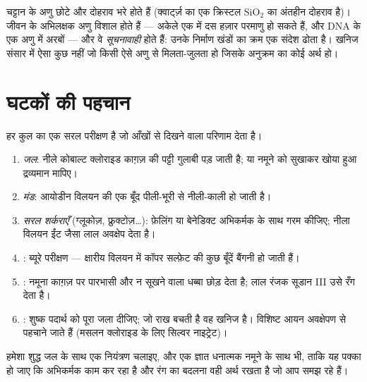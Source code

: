 \begin{remark}[वृहत् अणु और जीवन का आकार]\label{rem:g10:chemistry-of-life:macromolecules}
चट्टान के अणु छोटे और दोहराव भरे होते हैं (क्वार्ट्ज़ का एक क्रिस्टल
$\mathrm{SiO_2}$ का अंतहीन दोहराव है)। जीवन के अभिलक्षक अणु विशाल होते
हैं --- अकेले एक  में दस हज़ार परमाणु हो सकते हैं, और DNA के एक
अणु में अरबों --- और वे \emph{सूचनावाही} होते हैं: उनके निर्माण खंडों का
क्रम एक संदेश ढोता है। खनिज संसार में ऐसा कुछ नहीं जो किसी ऐसे अणु से
मिलता-जुलता हो जिसके अनुक्रम का कोई अर्थ हो।
\end{remark}

\section{घटकों की पहचान}

\begin{method}[कुलों के मानक परीक्षण]\label{met:g10:chemistry-of-life:tests}
हर कुल का एक सरल परीक्षण है जो आँखों से दिखने वाला परिणाम देता है।
\begin{enumerate}
  \item \emph{जल}: नीले कोबाल्ट क्लोराइड काग़ज़ की पट्टी गुलाबी पड़
        जाती है; या नमूने को सुखाकर खोया हुआ द्रव्यमान मापिए।
  \item \emph{मंड}: आयोडीन विलयन की एक बूँद पीली-भूरी से नीली-काली हो
        जाती है।
  \item \emph{सरल शर्कराएँ} (ग्लूकोज़, फ्रुक्टोज़\dots): फ़ेलिंग या
        बेनेडिक्ट अभिकर्मक के साथ गरम कीजिए; नीला विलयन ईंट जैसा लाल
        अवक्षेप देता है।
  \item \emph{}: ब्यूरे परीक्षण --- क्षारीय विलयन में कॉपर
        सल्फ़ेट की कुछ बूँदें बैंगनी हो जाती हैं।
  \item \emph{}: नमूना काग़ज़ पर पारभासी और न सूखने वाला धब्बा
        छोड़ देता है; लाल रंजक सूडान III उसे रँग देता है।
  \item \emph{}: शुष्क पदार्थ को पूरा जला दीजिए; जो राख बचती है
        वह खनिज है। विशिष्ट आयन अवक्षेपण से पहचाने जाते हैं (मसलन
        क्लोराइड के लिए सिल्वर नाइट्रेट)।
\end{enumerate}
हमेशा शुद्ध जल के साथ एक नियंत्रण चलाइए, और एक ज्ञात धनात्मक नमूने के
साथ भी, ताकि यह पक्का हो जाए कि अभिकर्मक काम कर रहा है और रंग का बदलना
वही अर्थ रखता है जो आप समझ रहे हैं।
\end{method}

